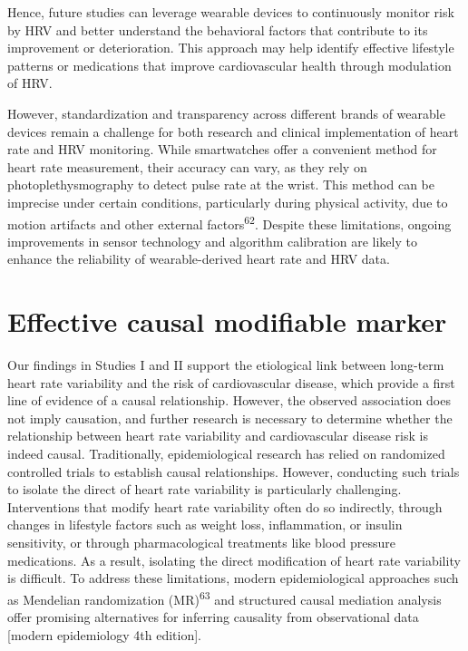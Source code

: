 \documentclass[
  a4paper,
  headsepline=true,
  open=any]{scrbook}
\begin{document}
Hence, future studies can leverage wearable devices to continuously
monitor risk by HRV and better understand the behavioral factors that
contribute to its improvement or deterioration. This approach may help
identify effective lifestyle patterns or medications that improve
cardiovascular health through modulation of HRV.

However, standardization and transparency across different brands of
wearable devices remain a challenge for both research and clinical
implementation of heart rate and HRV monitoring. While smartwatches
offer a convenient method for heart rate measurement, their accuracy can
vary, as they rely on photoplethysmography to detect pulse rate at the
wrist. This method can be imprecise under certain conditions,
particularly during physical activity, due to motion artifacts and other
external factors\textsuperscript{62}. Despite these limitations, ongoing
improvements in sensor technology and algorithm calibration are likely
to enhance the reliability of wearable-derived heart rate and HRV data.

\hypertarget{effective-causal-modifiable-marker}{%
\section{Effective causal modifiable
marker}\label{effective-causal-modifiable-marker}}

Our findings in Studies I and II support the etiological link between
long-term heart rate variability and the risk of cardiovascular disease,
which provide a first line of evidence of a causal relationship.
However, the observed association does not imply causation, and further
research is necessary to determine whether the relationship between
heart rate variability and cardiovascular disease risk is indeed causal.
Traditionally, epidemiological research has relied on randomized
controlled trials to establish causal relationships. However, conducting
such trials to isolate the direct of heart rate variability is
particularly challenging. Interventions that modify heart rate
variability often do so indirectly, through changes in lifestyle factors
such as weight loss, inflammation, or insulin sensitivity, or through
pharmacological treatments like blood pressure medications. As a result,
isolating the direct modification of heart rate variability is
difficult. To address these limitations, modern epidemiological
approaches such as Mendelian randomization (MR)\textsuperscript{63} and
structured causal mediation analysis offer promising alternatives for
inferring causality from observational data {[}modern epidemiology 4th
edition{]}.
\end{document}
